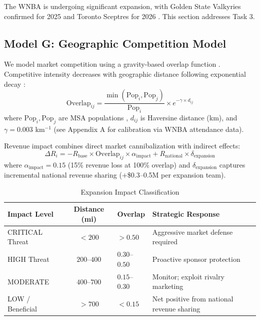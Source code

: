 \documentclass{mcmthesis}
\begin{document}
The WNBA is undergoing significant expansion, with Golden State Valkyries confirmed for 2025 and Toronto Sceptres for 2026 \cite{espn2024wnba}. This section addresses Task 3.

\subsection{Model G: Geographic Competition Model}
We model market competition using a gravity-based overlap function \cite{huff1964}. Competitive intensity decreases with geographic distance following exponential decay \cite{humphreys2008}:
\begin{equation}
\text{Overlap}_{ij} = \frac{\min(\text{Pop}_i, \text{Pop}_j)}{\text{Pop}_i} \times e^{-\gamma \times d_{ij}}
\end{equation}
where $\text{Pop}_i, \text{Pop}_j$ are MSA populations \cite{census2024}, $d_{ij}$ is Haversine distance (km), and $\gamma = 0.003$ km$^{-1}$ (see Appendix A for calibration via WNBA attendance data).

Revenue impact combines direct market cannibalization with indirect effects:
\begin{equation}
\Delta R_i = -R_{\text{base}} \times \text{Overlap}_{ij} \times \alpha_{\text{impact}} + R_{\text{national}} \times \delta_{\text{expansion}}
\end{equation}
where $\alpha_{\text{impact}} = 0.15$ (15\% revenue loss at 100\% overlap) and $\delta_{\text{expansion}}$ captures incremental national revenue sharing ($+$\$0.3--0.5M per expansion team).

\begin{table}[H]
\centering
\caption{Expansion Impact Classification}
\small
\begin{tabular}{lcll}
\toprule
\textbf{Impact Level} & \textbf{Distance (mi)} & \textbf{Overlap} & \textbf{Strategic Response} \\
\midrule
CRITICAL Threat & $< 200$ & $> 0.50$ & Aggressive market defense required \\
HIGH Threat & $200$--$400$ & $0.30$--$0.50$ & Proactive sponsor protection \\
MODERATE & $400$--$700$ & $0.15$--$0.30$ & Monitor; exploit rivalry marketing \\
LOW / Beneficial & $> 700$ & $< 0.15$ & Net positive from national revenue sharing \\
\bottomrule
\end{tabular}
\end{table}
\end{document}
